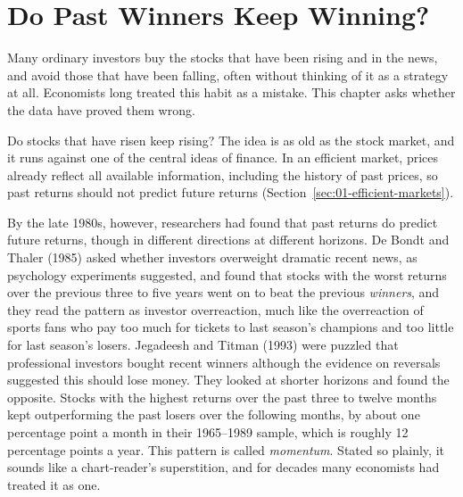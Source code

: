 \makeatletter
{}
\makeatother

\chapter{Do Past Winners Keep Winning?}
\label{ch:04}
\providecommand{\term}[1]{\emph{#1}}

Many ordinary investors buy the stocks that have been rising and in the news, and avoid those that have been falling, often without thinking of it as a strategy at all. Economists long treated this habit as a mistake. This chapter asks whether the data have proved them wrong.

Do stocks that have risen keep rising? The idea is as old as the stock market, and it runs against one of the central ideas of finance. In an efficient market, prices already reflect all available information, including the history of past prices, so past returns should not predict future returns (Section~\ref{sec:01-efficient-markets}). 

By the late 1980s, however, researchers had found that past returns do predict future returns, though in different directions at different horizons. De Bondt and Thaler (1985) asked whether investors overweight dramatic recent news, as psychology experiments suggested, and found that stocks with the worst returns over the previous three to five years went on to beat the previous \term{winners}, and they read the pattern as investor overreaction, much like the overreaction of sports fans who pay too much for tickets to last season's champions and too little for last season's losers. Jegadeesh and Titman (1993) were puzzled that professional investors bought recent winners although the evidence on reversals suggested this should lose money. They looked at shorter horizons and found the opposite. Stocks with the highest returns over the past three to twelve months kept outperforming the past losers over the following months, by about one percentage point a month in their 1965--1989 sample, which is roughly 12 percentage points a year. This pattern is called \term{momentum}\label{kt:momentum}. Stated so plainly, it sounds like a chart-reader's superstition, and for decades many economists had treated it as one.

